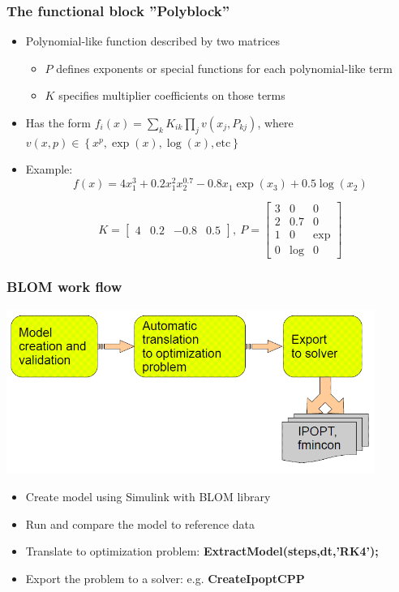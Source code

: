 \documentclass[mathserif]{beamer}
\begin{document}
\begin{frame}
\frametitle{The functional block ''Polyblock''}
\begin{itemize}
\item Polynomial-like function described by two matrices
\begin{itemize}
\item $P$ defines exponents or special functions for each polynomial-like term
\item $K$ specifies multiplier coefficients on those terms
\end{itemize}
\item Has the form $f_i(x)=\sum_k K_{ik} \prod_j
v(x_j, P_{kj})$, where  $v(x, p) \in \left \{ x^p , \exp(x) ,
\log(x), \text{etc} \right \}$
\item Example:
\begin{equation*}
f(x) = 4 x_1^3 + 0.2 x_1^2 x_2^{0.7} - 0.8 x_1 \exp(x_3) + 0.5 \log( x_2)
\label{eq:example_poly}
\end{equation*}

\begin{equation*}
K = \left[\begin{array}{cccc} 4 & 0.2 & -0.8 & 0.5 \end{array}\right] ,~
P = \left[\begin{array}{ccc} 3 & 0 & 0  \\ 2 & 0.7 & 0  \\ 1 & 0 & \exp  \\ 0 & \log & 0    \end{array}\right]
\label{eq:example_sparserep}
\end{equation*}
\end{itemize}
\end{frame}


\begin{frame}
\frametitle{BLOM work flow}
\includegraphics[width=0.9\textwidth]{WorkFlowBlom}

\begin{itemize}
\item Create model using Simulink with BLOM library
\item Run and compare the model to reference data
\item Translate to optimization problem: {\bf ExtractModel(steps,dt,'RK4');}
\item Export the problem to a solver: e.g. {\bf CreateIpoptCPP }
\end{itemize}

\end{frame}
\end{document}
